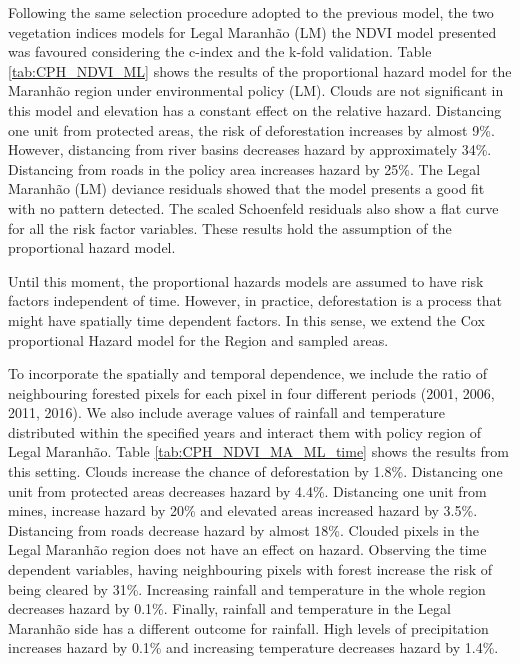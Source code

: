 
Following the same selection procedure adopted to the previous model, the two vegetation indices models for Legal Maranhão (LM) the NDVI model presented was favoured considering the c-index and the k-fold validation. Table \ref{tab:CPH_NDVI_ML} shows the results of the proportional hazard model for the Maranhão region under environmental policy (LM). Clouds are not significant in this model and elevation has a constant effect on the relative hazard. Distancing one unit from protected areas, the risk of deforestation increases by almost 9\%. However, distancing from river basins decreases hazard by approximately 34\%. Distancing from roads in the policy area increases hazard by 25\%. The Legal Maranhão (LM) deviance residuals showed that the model presents a good fit with no pattern detected. The scaled Schoenfeld residuals also show a flat curve for all the risk factor variables. These results hold the assumption of the proportional hazard model.


Until this moment, the proportional hazards models are assumed to have risk factors independent of time. However, in practice, deforestation is a process that might have spatially time dependent factors. In this sense, we extend the Cox proportional Hazard model for the Region and sampled areas. 

To incorporate the spatially and temporal dependence, we include the ratio of neighbouring forested pixels for each pixel in four different periods (2001, 2006, 2011, 2016). We also include average values of rainfall and temperature distributed within the specified years and interact them with policy region of Legal Maranhão. Table \ref{tab:CPH_NDVI_MA_ML_time} shows the results from this setting. Clouds increase the chance of deforestation by 1.8\%. Distancing one unit from protected areas decreases hazard by 4.4\%. Distancing one unit from mines, increase hazard by 20\% and elevated areas increased hazard by 3.5\%. Distancing from roads decrease hazard by almost 18\%. Clouded pixels in the Legal Maranhão region does not have an effect on hazard. Observing the time dependent variables, having neighbouring pixels with forest increase the risk of being cleared by 31\%. Increasing rainfall and temperature in the whole region decreases hazard by 0.1\%. Finally, rainfall and temperature in the Legal Maranhão side has a different outcome for rainfall. High levels of precipitation increases hazard by 0.1\% and increasing temperature decreases hazard by 1.4\%. 

